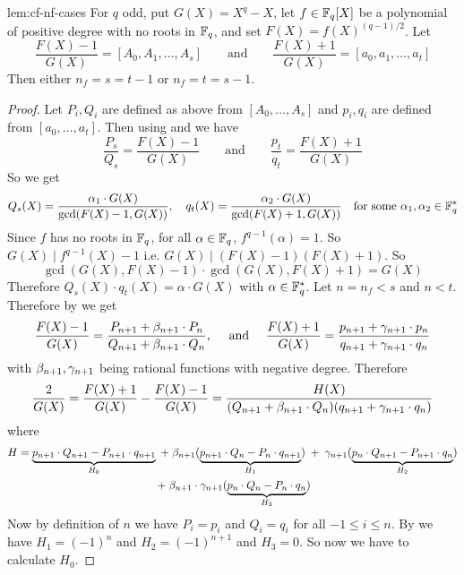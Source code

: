 \begin{lemma}{}{lem:cf-nf-cases}
  For $q$ odd, put $G(X)=X^q-X$, let $f\in\mathbb{F}_q[X]$ be a polynomial of positive degree with no roots in $\mathbb{F}_q$, and set $F(X)=f(X)^{(q-1)/2}$. Let $$\frac{F(X)-1}{G(X)}=[A_0,A_1,\dots,A_s]\qquad\text{and}\qquad\frac{F(X)+1}{G(X)}=[a_0,a_1,\dots,a_t]$$Then either $n_f=s=t-1$ or $n_f=t=s-1$.
\end{lemma}
\begin{proof}
  Let $P_i,Q_i$ are defined as above from $[A_0,\dots, A_s]$ and $p_i,q_i$ are defined from $[a_0,\dots,a_t]$. Then using  and  we have $$\frac{P_s}{Q_s}=\frac{F(X)-1}{G(X)}\qquad\text{and}\qquad\frac{p_t}{q_t}=\frac{F(X)+1}{G(X)}$$So we get 
  \begin{equation}\label{eq:Qs-gx-qt}
    Q_s(X)=\frac{\alpha_1\cdot G(X)}{\gcd(F(X)-1,G(X))},\quad q_t(X)=\frac{\alpha_2\cdot G(X)}{\gcd(F(X)+1,G(X))}\quad\text{for some }\alpha_1,\alpha_2\in\mathbb{F}_q^*
  \end{equation}
  Since $f$ has no roots in $\mathbb{F}_q$, for all $\alpha\in\mathbb{F}_q$, $f^{q-1}(\alpha)=1$. So $G(X)\mid f^{q-1}(X)-1$ i.e. $G(X)\mid (F(X)-1)(F(X)+1)$. So $$\gcd(G(X),F(X)-1)\cdot\gcd(G(X),F(X)+1)=G(X)$$Therefore $Q_s(X)\cdot q_t(X)=\alpha \cdot G(X)$ with $\alpha\in\mathbb{F}_q^*$. Let $n=n_f<s$ and $n<t$. Therefore by  we get $$\frac{F(X)-1}{G(X)}=\frac{P_{n+1}+\beta_{n+1}\cdot P_n}{Q_{n+1}+\beta_{n+1}\cdot Q_n},\quad\text{ and }\quad\frac{F(X)+1}{G(X)}=\frac{p_{n+1}+\gamma_{n+1}\cdot p_n}{q_{n+1}+\gamma_{n+1}\cdot q_n}$$with $\beta_{n+1},\gamma_{n+1}$ being rational functions with negative degree. Therefore 
  \begin{equation}\label{eq:gx-hx}
    \frac{2}{G(X)}=\frac{F(X)+1}{G(X)}-\frac{F(X)-1}{G(X)}=\frac{H(X)}{(Q_{n+1}+\beta_{n+1}\cdot Q_n)(q_{n+1}+\gamma_{n+1}\cdot q_n)}
  \end{equation}
  where \begin{multline}\label{eq:cont-frac-2GX}
    H  = \underbrace{p_{n+1}\cdot Q_{n+1}-P_{n+1}\cdot q_{n+1}}_{H_0}\;+\;\beta_{n+1}(\underbrace{p_{n+1}\cdot Q_n-P_n\cdot q_{n+1}}_{H_1})  
    \;+\; \gamma_{n+1}(\underbrace{p_n\cdot Q_{n+1}-P_{n+1}\cdot q_n}_{H_2})\\ 
    \;+\;\beta_{n+1}\cdot \gamma_{n+1}(\underbrace{p_n\cdot Q_n-P_n\cdot q_n}_{H_3}) 
  \end{multline}
  Now by definition of $n$ we have $P_i=p_i$ and $Q_i=q_i$ for all $-1\leq i\leq n$. By  we have $H_1=(-1)^n$ and $H_2=(-1)^{n+1}$ and $H_3=0$. So now we have to calculate $H_0$. 

\end{proof}

